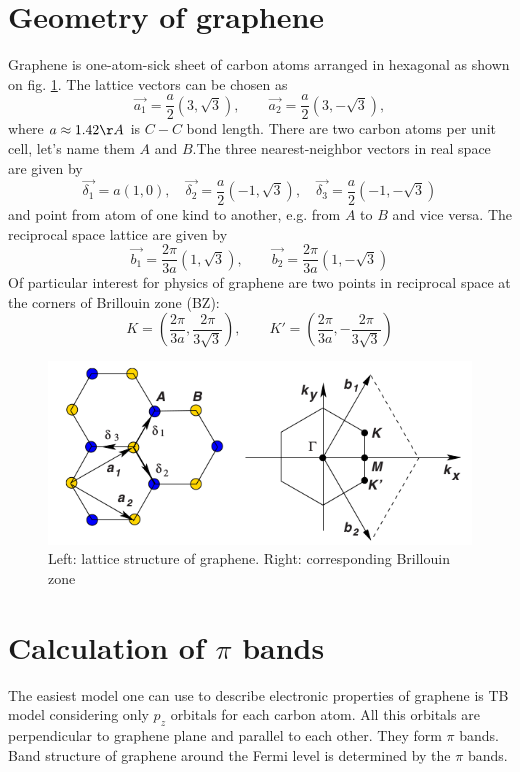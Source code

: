 \section{Geometry of graphene}
Graphene is one-atom-sick sheet of carbon atoms arranged in hexagonal as shown on fig. \ref{fig:graphene_lattice}. The lattice vectors can be chosen as 
\begin{equation}
	\vec{a_1} = \frac{a}{2} (3, \sqrt{3}), \qquad \vec{a_2} = \frac{a}{2} (3, - \sqrt{3}),
\end{equation}
where $a \approx 1.42 \AA$ is $C-C$ bond length. There are two carbon atoms per unit cell, let's name them $A$ and $B$.The three nearest-neighbor vectors in real space are given by 
\begin{equation}
	\vec{\delta_1} = a (1, 0), \quad \vec{\delta_2} = \frac{a}{2} (-1, \sqrt{3}), \quad \vec{\delta_3} = \frac{a}{2} (-1, -\sqrt{3})
\end{equation}
and point from atom of one kind to another, e.g. from $A$ to $B$ and vice versa.
The reciprocal space lattice are given by
\begin{equation}
	\vec{b_1} = \frac{2 \pi}{3 a}(1, \sqrt{3}), \qquad \vec{b_2} = \frac{2 \pi}{3 a} (1, -\sqrt{3})
\end{equation}
Of particular interest for physics of graphene are two points in reciprocal space at the corners of Brillouin zone (BZ):
\begin{equation}
	K = (\frac{2 \pi}{3 a}, \frac{2 \pi}{3 \sqrt{3}}), \qquad K' = (\frac{2 \pi}{3 a}, -\frac{2 \pi}{3 \sqrt{3}})
\end{equation}

\begin{figure}[ht]
\begin{center}
  \includegraphics[width=0.55\linewidth]{img/graphene_lattice}
  \caption{Left: lattice structure of graphene. Right: corresponding Brillouin zone \label{fig:graphene_lattice}}
\end{center}
\end{figure}

\section{Calculation of $\pi$ bands}
The easiest model one can use to describe electronic properties of graphene is TB model considering only $p_z$ orbitals for each carbon atom. All this orbitals are perpendicular to graphene plane and parallel to each other. They form $\pi$ bands. Band structure of graphene around the Fermi level is determined by the $\pi$ bands. 

